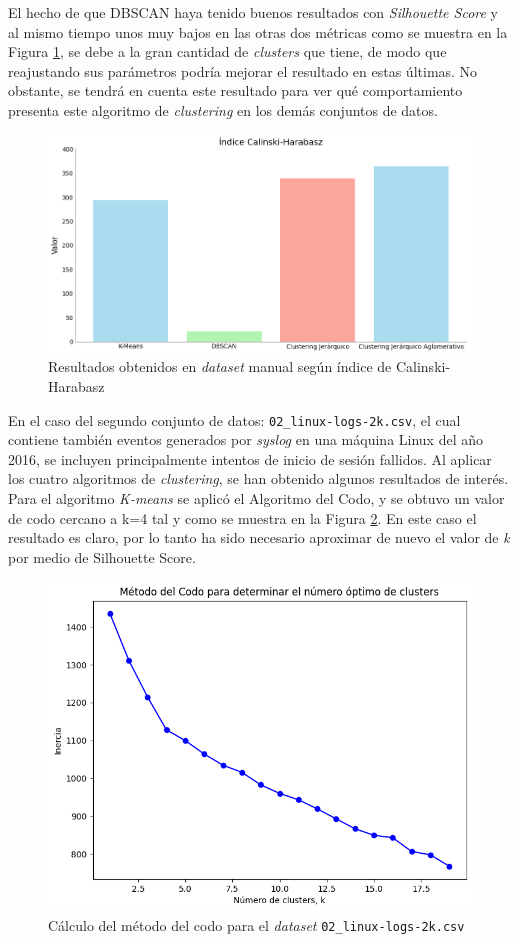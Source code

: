 El hecho de que \gls{DBSCAN} haya tenido buenos resultados con \textit{Silhouette Score} y al mismo tiempo unos muy bajos en las otras dos métricas como se muestra en la Figura \ref{fig:dataset_01}, se debe a la gran cantidad de \textit{clusters} que tiene, de modo que reajustando sus parámetros podría mejorar el resultado en estas últimas. No obstante, se tendrá en cuenta este resultado para ver qué comportamiento presenta este algoritmo de \textit{clustering} en los demás conjuntos de datos.

\begin{figure}[H]
    \centering
    \includegraphics[width=0.8\linewidth]{imagenes/dataset_01_calinski.png}
    \caption{Resultados obtenidos en \textit{dataset} manual según índice de Calinski-Harabasz}
    \label{fig:dataset_01}
\end{figure}

En el caso del segundo conjunto de datos: \texttt{02\_linux-logs-2k.csv}, el cual contiene también eventos generados por \textit{syslog} en una máquina Linux del año 2016, se incluyen principalmente intentos de inicio de sesión fallidos. Al aplicar los cuatro algoritmos de \textit{clustering}, se han obtenido algunos resultados de interés. \\

Para el algoritmo \textit{K-means} se aplicó el Algoritmo del Codo, y se obtuvo un valor de codo cercano a k=4 tal y como se muestra en la Figura \ref{fig:metodo-codo-dataset-02}. En este caso el resultado es claro, por lo tanto ha sido necesario aproximar de nuevo el valor de \textit{k} por medio de Silhouette Score.

\begin{figure}[H]
    \centering
    \includegraphics[width=0.7\linewidth]{imagenes/metodo-codo-dataset_02.png}
    \caption{Cálculo del método del codo para el \textit{dataset} \texttt{02\_linux-logs-2k.csv}}
    \label{fig:metodo-codo-dataset-02}
\end{figure}

